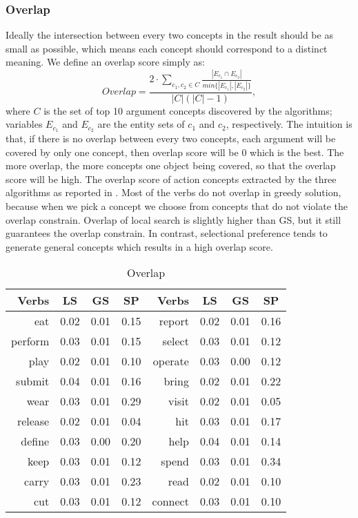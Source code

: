 \subsubsection{Overlap}
Ideally the intersection between every two concepts in the result
should be as small as possible, which means each concept should
correspond to a distinct meaning.
We define an overlap score simply as:
\[
Overlap = \frac{2\cdot\sum_{c_1,c_2\in C}{\frac{|E_{c_1} \cap E_{c_2}|}{min\{|E_{c_1}|,|E_{c_2}|\}}}}{|C|(|C|-1)},
\]
where $C$ is the set of top 10 argument concepts discovered by the algorithms;
variables $E_{c_1}$ and $E_{c_2}$ are the entity sets of $c_1$ and $c_2$, respectively.
The intuition is that, if there is no overlap between every two concepts, each argument
will be covered by only one concept, then overlap score will be 0 which is the best.
The more overlap, the more concepts one object being covered, so that the overlap score
will be high. The overlap score of action concepts extracted by the three algorithms
as reported in . Most of the verbs do not overlap in greedy solution,
because when we pick a concept we choose from concepts that do not violate the overlap
constrain. Overlap of local search is slightly higher than GS, but it still guarantees
the overlap constrain. In contrast, selectional preference tends to generate general
concepts which results in a high overlap score.

\begin{table}[th]
\small
\centering
\caption{Overlap}
\begin{tabular}{|r|c|c|c||r|c|c|c|}
\hline
Verbs&	LS&	GS&	SP&    Verbs&	LS&	GS&	SP	\\ \hline\hline
eat	&0.02	&0.01	&0.15 & report	&0.02	&0.01	&0.16 \\ \hline
perform	&0.03	&0.01	&0.15 & select	&0.03	&0.01	&0.12\\ \hline
play	&0.02	&0.01	&0.10 & operate	&0.03	&0.00	&0.12\\ \hline
submit	&0.04	&0.01	&0.16 & bring	&0.02	&0.01	&0.22\\ \hline
wear	&0.03	&0.01	&0.29 & visit	&0.02	&0.01	&0.05\\ \hline
release	&0.02	&0.01	&0.04 & hit	&0.03	&0.01	&0.17\\ \hline
define	&0.03	&0.00	&0.20 & help	&0.04	&0.01	&0.14\\ \hline
keep	&0.03	&0.01	&0.12 & spend	&0.03	&0.01	&0.34\\ \hline
carry	&0.03	&0.01	&0.23 & read	&0.02	&0.01	&0.10\\ \hline
cut	&0.03	&0.01	&0.12 & connect	&0.03	&0.01	&0.10\\ \hline
\end{tabular}
\label{tab:overlap}
\end{table}


